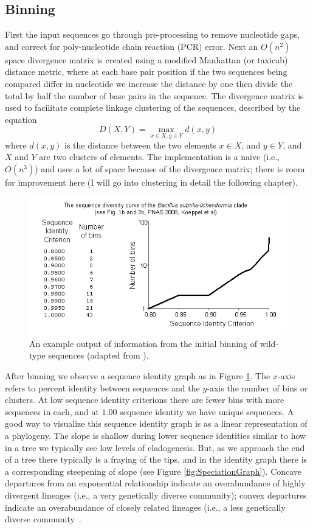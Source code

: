 \subsection*{Binning}
First the input sequences go through pre-processing to remove nucleotide gaps, and correct for poly-nucleotide chain reaction (PCR) error.
Next an $O(n^2)$ space divergence matrix is created using a modified Manhattan (or taxicab) distance metric, where at each base pair position if the two sequences being compared differ in nucleotide we increase the distance by one then divide the total by half the number of base pairs in the sequence.
The divergence matrix is used to facilitate complete linkage clustering of the sequences, described by the equation $$D(X,Y)= \max_{x\in X, y\in Y} d(x,y)$$ where $d(x,y)$ is the distance between the two elements $x \in X$, and $y \in Y$, and $X$ and $Y$ are two clusters of elements.
The implementation is a naive (i.e., $O(n^3)$) and uses a lot of space because of the divergence matrix; there is room for improvement here (I will go into clustering in detail the following chapter). 

\begin{figure}[h!]
 \centering
 \label{fig:Binning}
 \includegraphics[scale=1.75]{images/Binning-CH2}
 \caption[Sequence identity graph and example output produced by binning.]{An example output of information from the initial binning of wild-type sequences (adapted from \protect\cite{koeppel2008identifying}). }
  \label{fig:Binning}
\end{figure}

After binning we observe a sequence identity graph as in Figure \ref{fig:Binning}.
The $x$-axis refers to percent identity between sequences and the $y$-axis the number of bins or clusters.
At low sequence identity criterions there are fewer bins with more sequences in each, and at $1.00$ sequence identity we have unique sequences.
A good way to visualize this sequence identity graph is as a linear representation of a phylogeny.
The slope is shallow during lower sequence identities similar to how in a tree we typically see low levels of cladogenesis.
But, as we approach the end of a tree there typically is a fraying of the tips, and in the identity graph there is a corresponding steepening of slope (see Figure \ref{fig:SpeciationGraph}).
Concave departures from an exponential relationship indicate an overabundance of highly divergent lineages (i.e., a very genetically diverse community); convex departures indicate an overabundance of closely related lineages (i.e., a less genetically diverse community~\cite{bohannan2003new}.

